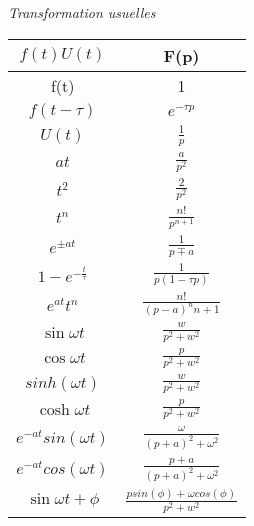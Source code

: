 \documentclass{article}
\begin{document}
\begin{center}
    \textit{Transformation usuelles}\\
    \begin{tabular}{|c|c|}
    \hline
    $f(t)U(t)$ & F(p) \\
    \hline
    f(t)&1\\
    \hline
    $f(t-\tau)$ & $e^{-\tau p}$\\
    \hline
    $ U(t) $ & $\frac{1}{p}$ \\
    \hline
    $at $ & $\frac{a}{p^2}$ \\
    \hline
    $t^2$ & $ \frac{2}{p^2} $ \\
    \hline
    $ t^n $ & $ \frac{n!}{p^{n+1}} $ \\
    \hline
    $e^{\pm at}$ & $\frac{1}{p\mp a}$ \\
    \hline
    $ 1- e^{-\frac{t}{\tau}} $ & $ \frac{1}{p(1-\tau p)} $ \\
    \hline
    $e^{at}t^{n}$ & $ \frac{n!}{(p-a)^n{n+1}} $\\
    \hline
     $\sin{\omega t}$ & $ \frac{w}{p^2+w^2} $ \\
    \hline
    $\cos{\omega t}$ & $\frac{p}{p^2+w^2}$ \\
    \hline
    $sinh(\omega t)$ & $ \frac{w}{p^2+w^2}$ \\
    \hline
    $\cosh{\omega t}$ & $\frac{p}{p^2+w^2}$ \\
    \hline
     $ e^{-at}sin(\omega t) $ & $ \frac{\omega}{(p+a)^2+\omega^2} $ \\
    \hline
     $ e^{-at}cos(\omega t) $ & $ \frac{p+a}{(p+a)^2+\omega^2} $ \\
    \hline
    $\sin{\omega t + \phi}$ & $\frac{psin(\phi) + \omega cos(\phi)}{p^2+w^2}$ \\
    \hline
    \end{tabular}
\end{center}
\thispagestyle{empty}
\end{document}

